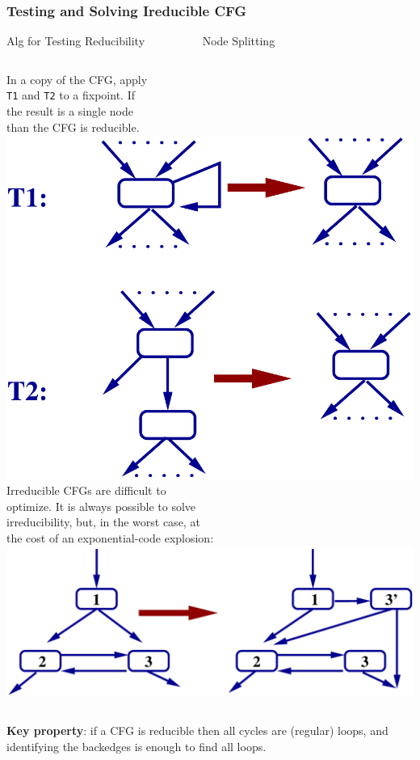 \documentclass{beamer}
\begin{document}
\begin{frame}[fragile,t]
    \frametitle{Testing and Solving Ireducible CFG}

\bigskip

\begin{block}{Alg for Testing Reducibility{\tt~~~~~~~~~~}Node Splitting}
\begin{columns}
In a copy of the \textsc{CFG}, apply\\
{\tt T1} and {\tt T2} to a fixpoint. If\\
the result is a single node\\
than the \textsc{CFG} is reducible.\\
%
\includegraphics[width=17ex]{Figures/T12}
Irreducible \textsc{CFG}s are difficult to\\
optimize. It is always possible to solve\\
irreducibility, but, in the worst case, at\\
the cost of an exponential-code explosion:\\
%
\includegraphics[width=34ex]{Figures/NodeSplit}
\end{columns}
\end{block}

{\bf Key property}: if a CFG is reducible then all cycles are (regular)
loops, and identifying the backedges is enough to find all loops.


\end{frame}
\end{document}
